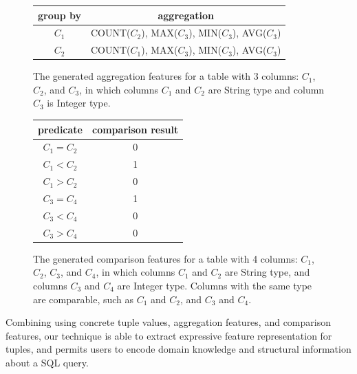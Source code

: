 \begin{figure}[t]
	\begin{center}
		\begin{tabular}{|c|c|}
		\hline
		\textbf{group by}	& \textbf{aggregation} \\
		\hline
		$C_1$ 				& \textsf{COUNT}($C_2$), \textsf{MAX}($C_3$), \textsf{MIN}($C_3$), \textsf{AVG}($C_3$)\\
		$C_2$ 				& \textsf{COUNT}($C_1$), \textsf{MAX}($C_3$), \textsf{MIN}($C_3$), \textsf{AVG}($C_3$)\\
		\hline
		\end{tabular}
	\end{center}
	\caption{The generated aggregation features for
a table with 3 columns:  $C_1$, $C_2$, and $C_3$, in which
columns $C_1$ and $C_2$ are \textsf{String} type and column $C_3$ is
\textsf{Integer} type.}
	\label{tbl:agg}
\end{figure}



\begin{figure}[t]
	\begin{center}
		\begin{tabular}{|c|c|}
		\hline
		\textbf{predicate}	& \textbf{comparison result} \\
		\hline
		$C_1=C_2$ 			& 0\\
		$C_1<C_2$ 			& 1\\
		$C_1>C_2$			& 0\\
		\hline
		$C_3=C_4$ 			& 1\\
		$C_3<C_4$ 			& 0\\
		$C_3>C_4$			& 0\\
		\hline
		\end{tabular}
	\end{center}
	\caption{The generated comparison features
for a table with 4 columns: $C_1$, $C_2$, $C_3$,
and $C_4$, in which columns $C_1$ and $C_2$ are \textsf{String} type, and
columns $C_3$ and $C_4$ are \textsf{Integer} type. Columns with
the same type are comparable, such as $C_1$ and $C_2$, and
$C_3$ and $C_4$.
}
	\label{tbl:com}
\end{figure}

Combining using concrete tuple values, aggregation
features, and comparison features, our technique is able to
extract expressive feature representation for tuples,
and permits users to encode domain knowledge and structural
information about a SQL query.



